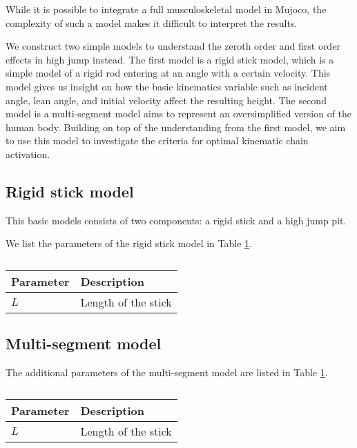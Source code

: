 \documentclass[twocolumn]{aastex631}
\begin{document}
While it is possible to integrate a full musculoskeletal model in Mujoco, the complexity of such a model makes it difficult to interpret the results.

We construct two simple models to understand the zeroth order and first order effects in high jump instead. The first model is a rigid stick model, which is a simple model of a rigid rod entering at an angle with a certain velocity. This model gives us insight on how the basic kinematics variable such as incident angle, lean angle, and initial velocity affect the resulting height. The second model is a multi-segment model aims to represent an oversimplified version of the human body. Building on top of the understanding from the first model, we aim to use this model to investigate the criteria for optimal kinematic chain activation.

\subsection{Rigid stick model}


This basic models consists of two components: a rigid stick and a high jump pit. 

We list the parameters of the rigid stick model in Table \ref{tab:stick_parameters}.
\begin{table}[hbt!]
    \begin{center}
    \begin{tabular}{ l l }
    \hline
    \hline
    Parameter &  Description \\
    \hline

    $L$ & Length of the stick \\
    
    \hline
    \hline
    \end{tabular}
    \caption{}
    \label{tab:stick_parameters}
    \end{center}
\end{table}

\subsection{Multi-segment model}

The additional parameters of the multi-segment model are listed in Table \ref{tab:stick_parameters}.
\begin{table}[hbt!]
    \begin{center}
    \begin{tabular}{ l l }
    \hline
    \hline
    Parameter &  Description \\
    \hline

    $L$ & Length of the stick \\
    \hline
    \hline
    \end{tabular}
    \caption{}
    \label{tab:ms_parameters}
    \end{center}
\end{table}
\end{document}
